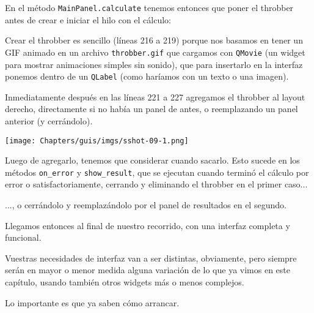 En el método \texttt{MainPanel.calculate} tenemos entonces que poner el throbber antes de crear e iniciar el hilo con el cálculo:


Crear el throbber es sencillo (líneas 216 a 219) porque nos basamos en tener un GIF animado en un archivo \texttt{throbber.gif} que cargamos con \texttt{QMovie} (un widget para mostrar animaciones simples sin sonido), que para insertarlo en la interfaz ponemos dentro de un \texttt{QLabel} (como haríamos con un texto o una imagen).

Inmediatamente después en las líneas 221 a 227 agregamos el throbber al layout derecho, directamente si no había un panel de antes, o reemplazando un panel anterior (y cerrándolo).

\begin{center}
    \texttt{[image: Chapters/guis/imgs/sshot-09-1.png]}
\end{center}

Luego de agregarlo, tenemos que considerar cuando sacarlo. Esto sucede en los métodos \texttt{on\_error} y \texttt{show\_result}, que se ejecutan cuando terminó el cálculo por error o satisfactoriamente, cerrando y eliminando el throbber en el primer caso...


..., o cerrándolo y reemplazándolo por el panel de resultados en el segundo.


Llegamos entonces al final de nuestro recorrido, con una interfaz completa y funcional.

Vuestras necesidades de interfaz van a ser distintas, obviamente, pero siempre serán en mayor o menor medida alguna variación de lo que ya vimos en este capítulo, usando también otros widgets más o menos complejos.

Lo importante es que ya saben cómo arrancar.
